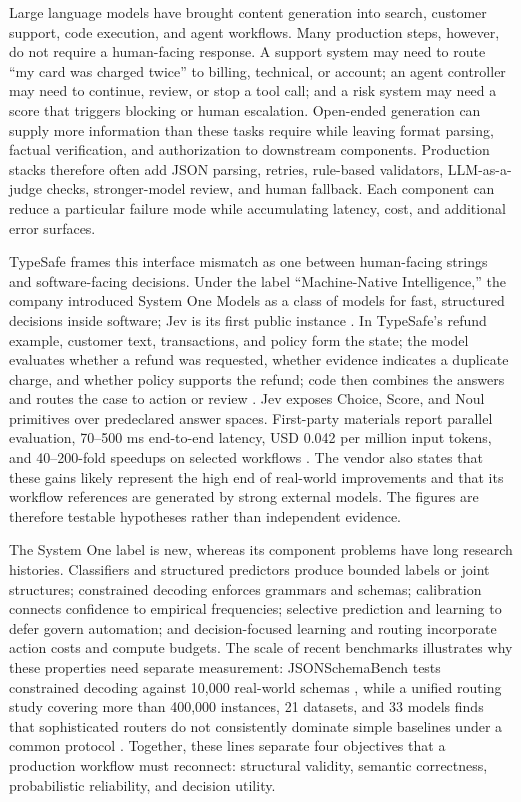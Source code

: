 \documentclass[11pt]{article}
\begin{document}
Large language models have brought content generation into search, customer support, code execution, and agent workflows. Many production steps, however, do not require a human-facing response. A support system may need to route ``my card was charged twice'' to billing, technical, or account; an agent controller may need to continue, review, or stop a tool call; and a risk system may need a score that triggers blocking or human escalation. Open-ended generation can supply more information than these tasks require while leaving format parsing, factual verification, and authorization to downstream components. Production stacks therefore often add JSON parsing, retries, rule-based validators, LLM-as-a-judge checks, stronger-model review, and human fallback. Each component can reduce a particular failure mode while accumulating latency, cost, and additional error surfaces.

TypeSafe frames this interface mismatch as one between human-facing strings and software-facing decisions. Under the label ``Machine-Native Intelligence,'' the company introduced System One Models as a class of models for fast, structured decisions inside software; Jev is its first public instance \cite{typesafe2026home,almeida2026jev,typesafe2026systemone}. In TypeSafe's refund example, customer text, transactions, and policy form the state; the model evaluates whether a refund was requested, whether evidence indicates a duplicate charge, and whether policy supports the refund; code then combines the answers and routes the case to action or review \cite{typesafe2026systemone}. Jev exposes Choice, Score, and Noul primitives over predeclared answer spaces. First-party materials report parallel evaluation, 70--500 ms end-to-end latency, USD 0.042 per million input tokens, and 40--200-fold speedups on selected workflows \cite{typesafe2026docs,almeida2026jev}. The vendor also states that these gains likely represent the high end of real-world improvements and that its workflow references are generated by strong external models. The figures are therefore testable hypotheses rather than independent evidence.

The System One label is new, whereas its component problems have long research histories. Classifiers and structured predictors produce bounded labels or joint structures; constrained decoding enforces grammars and schemas; calibration connects confidence to empirical frequencies; selective prediction and learning to defer govern automation; and decision-focused learning and routing incorporate action costs and compute budgets. The scale of recent benchmarks illustrates why these properties need separate measurement: JSONSchemaBench tests constrained decoding against 10,000 real-world schemas \cite{geng2025jsonschema}, while a unified routing study covering more than 400,000 instances, 21 datasets, and 33 models finds that sophisticated routers do not consistently dominate simple baselines under a common protocol \cite{li2026routerbench}. Together, these lines separate four objectives that a production workflow must reconnect: structural validity, semantic correctness, probabilistic reliability, and decision utility.
\end{document}
